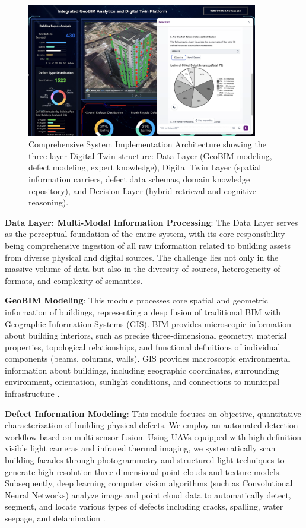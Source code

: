 \begin{figure}[htbp]
\centering
\includegraphics[width=0.9\textwidth]{figures/DefectGPT/System_implement.png}
\caption{Comprehensive System Implementation Architecture showing the three-layer Digital Twin structure: Data Layer (GeoBIM modeling, defect modeling, expert knowledge), Digital Twin Layer (spatial information carriers, defect data schemas, domain knowledge repository), and Decision Layer (hybrid retrieval and cognitive reasoning).}
\label{fig:system-implementation}
\end{figure}

\textbf{Data Layer: Multi-Modal Information Processing}: The Data Layer serves as the perceptual foundation of the entire system, with its core responsibility being comprehensive ingestion of all raw information related to building assets from diverse physical and digital sources. The challenge lies not only in the massive volume of data but also in the diversity of sources, heterogeneity of formats, and complexity of semantics.

\textbf{GeoBIM Modeling}: This module processes core spatial and geometric information of buildings, representing a deep fusion of traditional BIM with Geographic Information Systems (GIS). BIM provides microscopic information about building interiors, such as precise three-dimensional geometry, material properties, topological relationships, and functional definitions of individual components (beams, columns, walls). GIS provides macroscopic environmental information about buildings, including geographic coordinates, surrounding environment, orientation, sunlight conditions, and connections to municipal infrastructure \cite{boje2020towards}.

\textbf{Defect Information Modeling}: This module focuses on objective, quantitative characterization of building physical defects. We employ an automated detection workflow based on multi-sensor fusion. Using UAVs equipped with high-definition visible light cameras and infrared thermal imaging, we systematically scan building facades through photogrammetry and structured light techniques to generate high-resolution three-dimensional point clouds and texture models. Subsequently, deep learning computer vision algorithms (such as Convolutional Neural Networks) analyze image and point cloud data to automatically detect, segment, and locate various types of defects including cracks, spalling, water seepage, and delamination \cite{spencer2019advances}.

